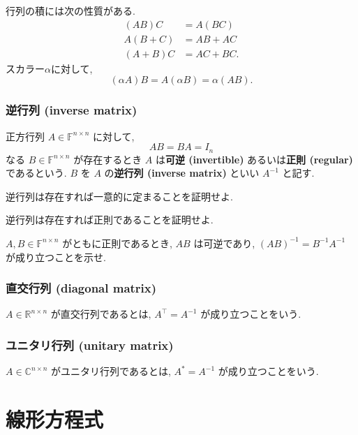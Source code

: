 \documentclass[a4paper]{scrbook}
\theoremstyle{definition}
\let\BeginKnitrBlock\begin \let\EndKnitrBlock\end
\begin{document}
行列の積には次の性質がある. \[
\begin{aligned}
  (AB)C & =A(BC)\\
  A(B+C) & =AB+AC\\
  (A+B)C & =AC+BC.
\end{aligned}
\] スカラー\(\alpha\)に対して, \[
  (\alpha A)B=A(\alpha B)=\alpha(AB).
\]

\subsubsection*{逆行列 (inverse matrix)}\label{-inverse-matrix}

正方行列 \(A\in\mathbb{F}^{n\times n}\) に対して, \[
  AB=BA=I_{n}
\] なる \(B\in\mathbb{F}^{n\times n}\) が存在するとき \(A\)
は\textbf{可逆 (invertible)} あるいは\textbf{正則 (regular)}
であるという. \(B\) を \(A\) の\textbf{逆行列 (inverse matrix)} といい
\(A^{-1}\) と記す.

\BeginKnitrBlock{exercise}
逆行列は存在すれば一意的に定まることを証明せよ.
\EndKnitrBlock{exercise}

\BeginKnitrBlock{exercise}
逆行列は存在すれば正則であることを証明せよ.
\EndKnitrBlock{exercise}

\BeginKnitrBlock{exercise}
\(A,B\in\mathbb{F}^{n\times n}\) がともに正則であるとき, \(AB\)
は可逆であり, \((AB)^{-1}=B^{-1}A^{-1}\) が成り立つことを示せ.
\EndKnitrBlock{exercise}

\subsubsection*{直交行列 (diagonal matrix)}\label{-diagonal-matrix}

\(A\in\mathbb{R}^{n\times n}\) が直交行列であるとは, \(A^{\top}=A^{-1}\)
が成り立つことをいう.

\subsubsection*{ユニタリ行列 (unitary matrix)}\label{-unitary-matrix}

\(A\in\mathbb{C}^{n\times n}\) がユニタリ行列であるとは,
\(A^{*}=A^{-1}\) が成り立つことをいう.

\section{線形方程式}
\end{document}
